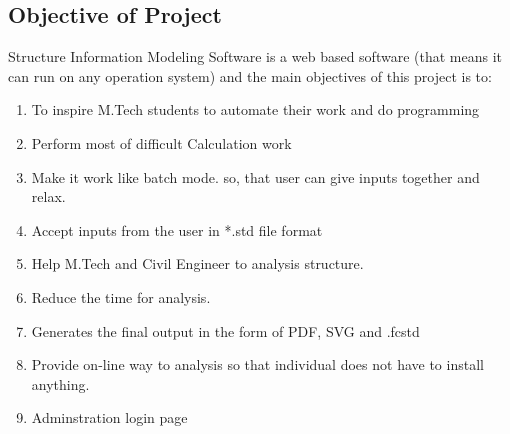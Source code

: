 \begin{itemize}
\section{Objective of Project}
Structure Information Modeling Software is a web based software (that means it can run on any operation system) and the main objectives of this project is to:
\begin{enumerate}
\item To inspire M.Tech students to automate their work and do programming
\item Perform most of difficult Calculation work
\item Make it work like batch mode. so, that user can give inputs together and relax.
\item Accept inputs from the user in *.std file format
\item Help M.Tech and Civil Engineer to analysis structure.
\item Reduce the time for analysis.
\item Generates the final output in the form of PDF, SVG and .fcstd
\item Provide on-line way to analysis so that individual does not have to install anything.
\item Adminstration login page
\end{enumerate}

\end{itemize}

